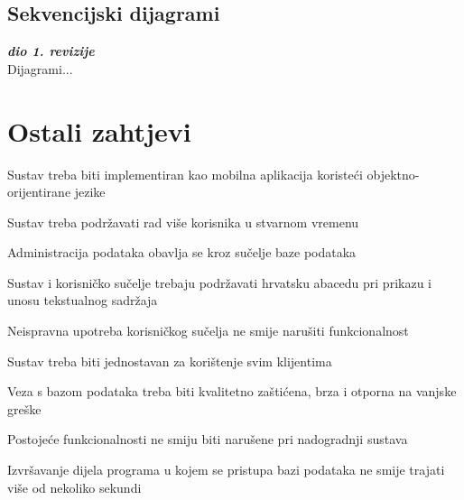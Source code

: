 					\eject
				\eject		
				
			\subsection{Sekvencijski dijagrami}
				
				\textbf{\textit{dio 1. revizije}}\\
				
				Dijagrami...
				\eject
	
		\section{Ostali zahtjevi}
		 
			\begin{packed_item}

				\item  Sustav treba biti implementiran kao mobilna aplikacija koristeći objektno-orijentirane jezike
				\item  Sustav treba podržavati rad više korisnika u stvarnom vremenu
				\item  Administracija podataka obavlja se kroz sučelje baze podataka
				\item  Sustav i korisničko sučelje trebaju podržavati hrvatsku abacedu pri prikazu i unosu tekstualnog sadržaja
				\item  Neispravna upotreba korisničkog sučelja ne smije narušiti funkcionalnost
				\item  Sustav treba biti jednostavan za korištenje svim klijentima
				\item  Veza s bazom podataka treba biti kvalitetno zaštićena, brza i otporna na vanjske greške
				\item  Postojeće funkcionalnosti ne smiju biti narušene pri nadogradnji sustava
				\item  Izvršavanje dijela programa u kojem se pristupa bazi podataka ne smije trajati više od nekoliko sekundi

			\end{packed_item}
			 
			 
			 
	
